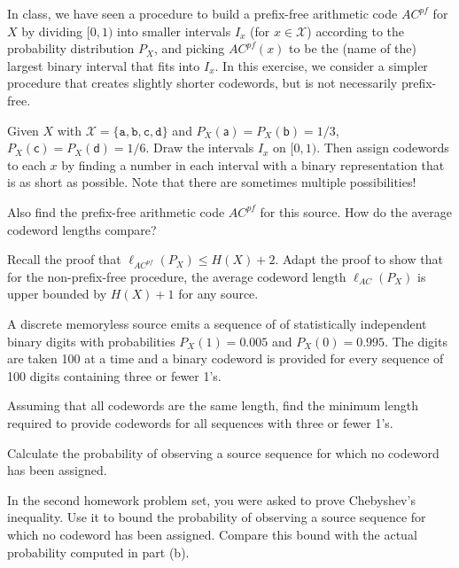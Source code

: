 \documentclass[a4paper,10pt,landscape,twocolumn]{scrartcl}
\begin{document}
\begin{exercise}
In class, we have seen a procedure to build a prefix-free arithmetic code $AC^{pf}$ for $X$ by dividing $[0,1)$ into smaller intervals $I_x$ (for $x \in \mathcal{X}$) according to the probability distribution $P_X$, and picking $AC^{pf}(x)$ to be the (name of the) largest binary interval that fits into $I_x$. In this exercise, we consider a simpler procedure that creates slightly shorter codewords, but is not necessarily prefix-free.
	\begin{subex}
	Given $X$ with $\mathcal{X} = \{\mathtt{a,b,c,d}\}$ and $P_X(\mathsf{a}) = P_X(\mathsf{b}) = 1/3$, $P_X(\mathsf{c}) = P_X(\mathsf{d}) = 1/6$. Draw the intervals $I_x$ on $[0,1)$. Then assign codewords to each $x$ by finding a number in each interval with a binary representation that is as short as possible. Note that there are sometimes multiple possibilities!
	\end{subex}
	\begin{subex}
	Also find the prefix-free arithmetic code $AC^{pf}$ for this source. How do the average codeword lengths compare?
	\end{subex}
	\begin{subex}
	Recall the proof that $\ell_{AC^{pf}}(P_X) \leq H(X) + 2$. Adapt the proof to show that for the non-prefix-free procedure, the average codeword length $\ell_{AC}(P_X)$ is upper bounded by $H(X) + 1$ for any source.
	\end{subex}
\end{exercise}

\begin{exercise}
A discrete memoryless source emits a sequence of of statistically independent binary digits with probabilities $P_X(1) = 0.005$ and $P_X(0) = 0.995$. The digits are taken 100 at a time and a binary codeword is provided for every sequence of 100 digits containing three or fewer 1's.
	\begin{subex}
	Assuming that all codewords are the same length, find the minimum length required to
provide codewords for all sequences with three or fewer 1's.
	\end{subex}
	\begin{subex}
	Calculate the probability of observing a source sequence for which no codeword has
been assigned.
	\end{subex}
	\begin{subex}
	In the second homework problem set, you were asked to prove Chebyshev's inequality.
	Use it to bound the probability of observing a source sequence for
which no codeword has been assigned. Compare this bound with the actual probability computed
in part (b).
	\end{subex}
\end{exercise}
\end{document}
